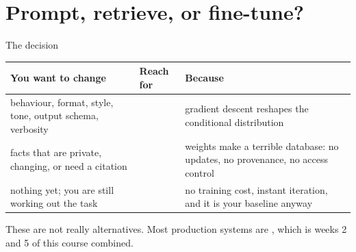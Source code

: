 \documentclass[aspectratio=169,10pt]{beamer}
\begin{document}
\section{Prompt, retrieve, or fine-tune?}

\begin{frame}{The decision}
  \centering
  \begin{tabular}{@{}L{3.4cm} L{2.2cm} L{5.4cm}@{}}
    \toprule
    \textbf{You want to change} & \textbf{Reach for} & \textbf{Because}\\
    \midrule
    behaviour, format, style, tone, output schema, verbosity &
       &
      gradient descent reshapes the conditional distribution\\
      \addlinespace[0.6em]
    facts that are private, changing, or need a citation &  &
      weights make a terrible database: no updates, no provenance, no access
      control\\
      \addlinespace[0.6em]
    nothing yet; you are still working out the task &
       &
      no training cost, instant iteration, and it is your baseline anyway\\
    \bottomrule
  \end{tabular}

  \vspace{0.5em}
  \raggedright
  These are not really alternatives. Most production systems are
  , which is weeks 2
  and 5 of this course combined.
\end{frame}
\end{document}
